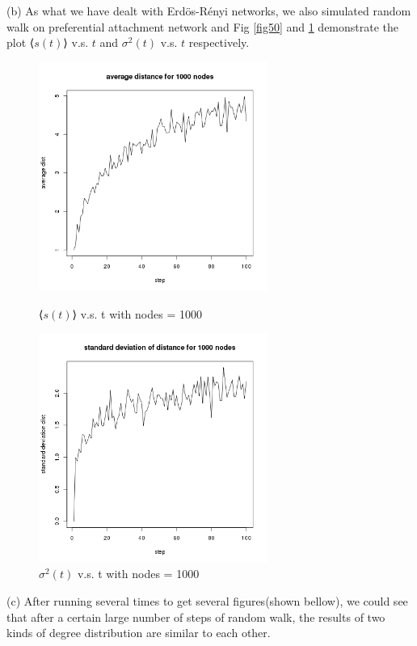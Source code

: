 \documentclass[draftcls,12pt,onecolumn]{IEEEtran}
\begin{document}
(b) As what we have dealt with Erd\"os-R\'enyi networks, we also simulated random walk on preferential attachment network and Fig \ref{fig50} and \ref{fig51} demonstrate the plot ⟨$s(t)$⟩ v.s. $t$ and $\sigma^2(t)$ v.s. $t$ respectively.
\begin{figure}[htbp]
\centering
\begin{minipage}[t]{0.48\textwidth}
\centering
\includegraphics[width=7.5cm]{2_2_b_distance.png}
\caption{⟨$s(t)$⟩ v.s. t with nodes = 1000}
\label{fig50}
\end{minipage}
\begin{minipage}[t]{0.48\textwidth}
\centering
\includegraphics[width=7.5cm]{2_2_b_deviation.png}
\caption{$\sigma^2(t)$ v.s. t with nodes = 1000}
\label{fig51}
\end{minipage}
\end{figure}
(c) After running several times to get several figures(shown bellow), we could see that after a certain large number of steps of random walk, the results of two kinds of degree distribution are similar to each other.
\end{document}
